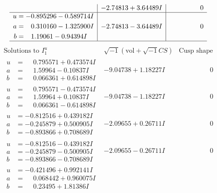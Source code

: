 \documentclass[1p]{elsarticle_modified}
\theoremstyle{definition}
\newcommand{\I}{\sqrt{-1}}
\begin{document}
$$\begin{array}{c|c|c}
 & -2.74813 + 3.64489 I & \phantom{-0.000000 } 0 \\ \hline\begin{aligned}
u &= -0.895296 - 0.589714 I \\
a &= \phantom{-}0.310160 - 1.325900 I \\
b &= \phantom{-}1.19061 - 0.94394 I\end{aligned}
 & -2.74813 - 3.64489 I & \phantom{-0.000000 } 0\\
 \hline 
 \end{array}$$\newpage$$\begin{array}{c|c|c}  
\text{Solutions to }I^u_{1}& \I (\text{vol} + \sqrt{-1}CS) & \text{Cusp shape}\\
 \hline 
\begin{aligned}
u &= \phantom{-}0.795571 + 0.473574 I \\
a &= \phantom{-}1.59964 - 0.10837 I \\
b &= \phantom{-}0.066361 + 0.614898 I\end{aligned}
 & -9.04738 + 1.18227 I & \phantom{-0.000000 } 0 \\ \hline\begin{aligned}
u &= \phantom{-}0.795571 - 0.473574 I \\
a &= \phantom{-}1.59964 + 0.10837 I \\
b &= \phantom{-}0.066361 - 0.614898 I\end{aligned}
 & -9.04738 - 1.18227 I & \phantom{-0.000000 } 0 \\ \hline\begin{aligned}
u &= -0.812516 + 0.439182 I \\
a &= -0.245879 + 0.500905 I \\
b &= -0.893866 + 0.708689 I\end{aligned}
 & -2.09655 + 0.26711 I & \phantom{-0.000000 } 0 \\ \hline\begin{aligned}
u &= -0.812516 - 0.439182 I \\
a &= -0.245879 - 0.500905 I \\
b &= -0.893866 - 0.708689 I\end{aligned}
 & -2.09655 - 0.26711 I & \phantom{-0.000000 } 0 \\ \hline\begin{aligned}
u &= -0.421496 + 0.992141 I \\
a &= \phantom{-}0.068442 + 0.960075 I \\
b &= \phantom{-}0.23495 + 1.81386 I\end{aligned}

\end{array}$$
\end{document}
